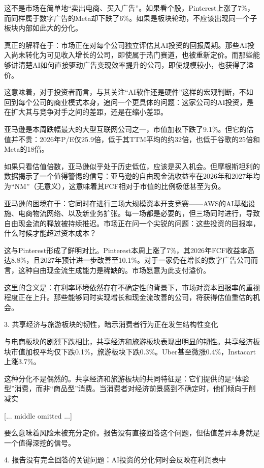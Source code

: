 \documentclass[11pt]{ctexart}
\begin{document}
这不是市场在简单地“卖出电商、买入广告”。如果看个股，Pinterest上涨了7\%，而同样属于数字广告的Meta却下跌了6\%。如果是板块轮动，不应该出现同一个子板块内部如此大的分化。

真正的解释在于：市场正在对每个公司独立评估其AI投资的回报周期。那些AI投入尚未转化为可见收入增长的公司，即使属于热门赛道，也被重新定价。而那些能够讲清楚AI如何直接驱动广告变现效率提升的公司，即使规模较小，也获得了溢价。

这意味着，对于投资者而言，与其关注“AI软件还是硬件”这样的宏观判断，不如回到每个公司的商业模式本身，追问一个更具体的问题：这家公司的AI投资，是在扩大其与竞争对手之间的差距，还是在缩小差距。

亚马逊是本周跌幅最大的大型互联网公司之一，市值加权下跌了9.1\%。但它的估值并不贵：2026年P/E仅25.9倍，低于其TTM平均的约32倍，也低于谷歌的25倍和Meta的18倍。

如果只看估值倍数，亚马逊似乎处于历史低位，应该是买入机会。但摩根斯坦利的数据揭示了一个值得警惕的信号：亚马逊的自由现金流收益率在2026年和2027年均为“NM”（无意义），这意味着其FCF相对于市值的比例极低甚至为负。

亚马逊的困境在于：它同时在进行三场大规模资本开支竞赛——AWS的AI基础设施、电商物流网络、以及新业务扩张。每一场都是必要的，但三场同时进行，导致自由现金流的释放被持续推迟。市场正在问一个尖锐的问题：这些投资的回报率，什么时候才能超过资本成本？

这与Pinterest形成了鲜明对比。Pinterest本周上涨了7\%，其2026年FCF收益率高达8.8\%，且2027年预计进一步改善至10.1\%。对于一家仍在增长的数字广告公司而言，这种自由现金流生成能力是稀缺的。市场愿意为此支付溢价。

这里的含义是：在利率环境依然存在不确定性的背景下，市场对资本回报率的重视程度正在上升。那些能够同时实现增长和现金流改善的公司，将获得估值重估的机会。

3. 共享经济与旅游板块的韧性，暗示消费者行为正在发生结构性变化

与电商板块的剧烈下跌相比，共享经济和旅游板块表现出明显的韧性。共享经济板块市值加权平均仅下跌0.1\%，旅游板块下跌0.3\%。Uber甚至微涨0.4\%，Instacart上涨3.7\%。

这种分化不是偶然的。共享经济和旅游板块的共同特征是：它们提供的是“体验型”消费，而非“商品型”消费。当消费者对经济前景感到不确定时，他们倾向于削减实

[... middle omitted ...]

要么意味着风险未被充分定价。报告没有直接回答这个问题，但估值差异本身就是一个值得深挖的信号。

4. 报告没有完全回答的关键问题：AI投资的分化何时会反映在利润表中
\end{document}
